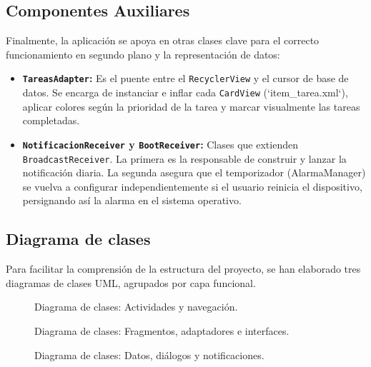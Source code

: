 \documentclass{article}
\begin{document}
\subsection{Componentes Auxiliares}

Finalmente, la aplicación se apoya en otras clases clave para el correcto funcionamiento en segundo plano y la representación de datos:

\begin{itemize}
    \item \textbf{\texttt{TareasAdapter}:} Es el puente entre el \texttt{RecyclerView} y el cursor de base de datos. Se encarga de instanciar e inflar cada \texttt{CardView} (`item\_tarea.xml`), aplicar colores según la prioridad de la tarea y marcar visualmente las tareas completadas.
    \item \textbf{\texttt{NotificacionReceiver} y \texttt{BootReceiver}:} Clases que extienden \texttt{Broadcast\allowbreak Receiver}. La primera es la responsable de construir y lanzar la notificación diaria. La segunda asegura que el temporizador (AlarmaManager) se vuelva a configurar independientemente si el usuario reinicia el dispositivo, persignando así la alarma en el sistema operativo.
\end{itemize}

\subsection{Diagrama de clases}

Para facilitar la comprensión de la estructura del proyecto, se han elaborado tres diagramas de clases UML, agrupados por capa funcional.

\begin{figure}[H]
    \centering
    
    \caption{Diagrama de clases: Actividades y navegación.}
\end{figure}

\begin{figure}[H]
    \centering
    
    \caption{Diagrama de clases: Fragmentos, adaptadores e interfaces.}
\end{figure}

\begin{figure}[H]
    \centering
    
    \caption{Diagrama de clases: Datos, diálogos y notificaciones.}
\end{figure}
\end{document}

